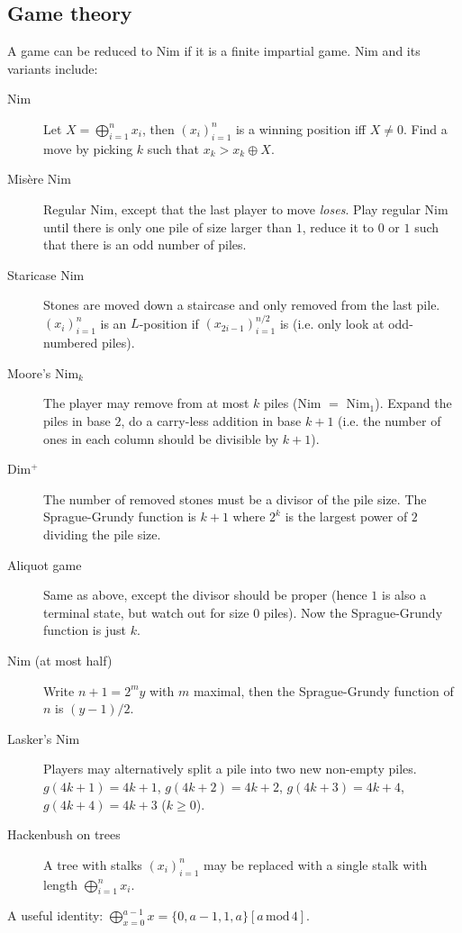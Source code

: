 \documentclass{article}
\begin{document}
\subsection{Game theory}

A game can be reduced to Nim if it is a finite impartial game. Nim and its variants include:
\begin{description}
	\item[Nim] Let $X = \bigoplus_{i=1}^n x_i$, then $(x_i)_{i=1}^n$ is a winning position iff $X\neq 0$. Find a move by picking $k$ such that $x_k > x_k \oplus X$.
	\item[Mis\`{e}re Nim] Regular Nim, except that the last player to move \textit{loses}. Play regular Nim until there is only one pile of size larger than $1$, reduce it to $0$ or $1$ such that there is an odd number of piles.
	\item[Staricase Nim] Stones are moved down a staircase and only removed from the last pile. $(x_i)_{i=1}^n$ is an $L$-position if $(x_{2i-1})_{i=1}^{n/2}$ is (i.e. only look at odd-numbered piles).
	\item[Moore's Nim$_k$] The player may remove from at most $k$ piles (Nim $=$ Nim$_1$). Expand the piles in base $2$, do a carry-less addition in base $k+1$ (i.e. the number of ones in each column should be divisible by $k+1$).
	\item[Dim$^+$] The number of removed stones must be a divisor of the pile size. The Sprague-Grundy function is $k+1$ where $2^k$ is the largest power of $2$ dividing the pile size.
	\item[Aliquot game] Same as above, except the divisor should be proper (hence $1$ is also a terminal state, but watch out for size $0$ piles). Now the Sprague-Grundy function is just $k$.
	\item[Nim (at most half)] Write $n+1 = 2^my$ with $m$ maximal, then the Sprague-Grundy function of $n$ is $(y - 1) / 2$.
	\item[Lasker's Nim] Players may alternatively split a pile into two new non-empty piles. $g(4k+1) = 4k+1$, $g(4k+2) = 4k+2$, $g(4k+3) = 4k+4$, $g(4k+4) = 4k+3$ ($k\geq 0$).
	\item[Hackenbush on trees] A tree with stalks $(x_i)_{i=1}^n$ may be replaced with a single stalk with length $\bigoplus_{i=1}^n x_i$.
\end{description}

A useful identity: $\bigoplus_{x=0}^{a - 1} x = \{0, a - 1, 1, a\}[a \, \mathrm{mod} \, 4]$.
\end{document}
